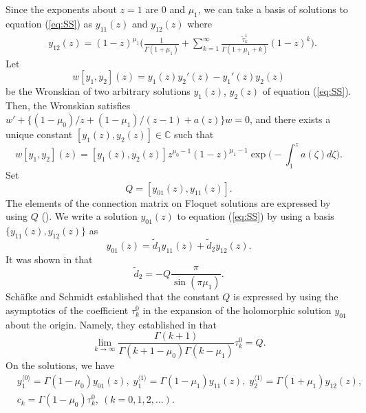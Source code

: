 \documentclass[12pt]{amsart}
\newcommand{\C}{\mathbb {C}}     %
\numberwithin{equation}{section}
\theoremstyle{definition}
\theoremstyle{remark}
\begin{document}
Since the exponents about $z=1$ are $0 $ and $ \mu _1 $, we can take a basis of solutions to equation (\ref{eq:SS}) as $y_{11}(z) $ and $y_{12} (z) $ where
\begin{align}
& y_{12} (z) = (1-z)^{\mu _1} \Big( \frac{1}{\Gamma (1+\mu _1)} +\sum _{k=1}^{\infty }  \frac{\tilde{\tau }^1 _k  }{\Gamma (1+\mu _1 +k )} (1-z)^k  \Big) . \nonumber 
\end{align}
Let
\begin{equation}
 w[ y_1, y_2 ] (z) = y_1 (z) y_2 '(z) - y_1 '(z) y_2 (z) 
\end{equation}
be the Wronskian of two arbitrary solutions $y_1 (z)$, $y_2 (z)$ of equation (\ref{eq:SS}).
Then, the Wronskian satisfies $ w' +\{ (1-\mu _0)/z + (1-\mu _1)/(z-1) + a(z) \} w =0 $, and there exists a unique constant $[ y_1 (z), y_2 (z) ]  \in \C $ such that
\begin{equation}
 w[ y_1, y_2 ] (z) = [ y_1 (z) , y_2 (z) ] z^{\mu _0 -1} (1-z)^{\mu _1 -1} \exp \Big( - \int _1 ^z a(\zeta ) d\zeta \Big) .
\end{equation}
Set
\begin{equation}
Q=  [ y_{01} (z) , y_{11} (z) ] .
\end{equation}
The elements of the connection matrix on Floquet solutions are expressed by using $Q$ (\cite[Proposition 2.14]{SS}).
We write a solution $y_{01} (z) $ to equation (\ref{eq:SS}) by using a basis  $\{ y_{11} (z) , y_{12} (z) \} $ as  
\begin{equation}
 y_{01} (z) = \tilde{d}_{1} y_{11} (z) +\tilde{d}_2 y_{12} (z) .
\label{eq:ty0td1td2}
\end{equation}
It was shown in \cite[Proposition 2.14]{SS} that 
\begin{equation}
\tilde{d}_2 =  - Q \frac{\pi }{\sin (\pi \mu _1)} .
\label{eq:td2}
\end{equation}
Sch{\"a}fke and Schmidt established that the constant $Q$ is expressed by using the asymptotics of the coefficient $\tau _k^0$ in the expansion of the holomorphic solution $y_{01} $ about the origin. 
Namely, they established in \cite[Theorem 2.15]{SS} that 
\begin{equation}
\lim _{k \to \infty } \frac{\Gamma (k+1)}{\Gamma (k+1 - \mu _0)\Gamma (k - \mu _1)} \tau _k^0 = Q .
\label{eq:SSTh215}
\end{equation} 
On the solutions, we have
\begin{align}
& y^{\langle 0 \rangle} _1 = \Gamma (1-\mu _0 )y_{01} (z) , \; y^{\langle 1 \rangle} _1 = \Gamma (1 -\mu _1 )y_{11} (z) , \; y^{\langle 1 \rangle} _2 = \Gamma (1+\mu _1 )y_{12} (z) , \label{eq:rely0y01etc} \\
& c_k = \Gamma (1-\mu _0 ) \tau ^0 _k , \: (k=0,1,2,\dots ) .  \nonumber
\end{align}
\end{document}
